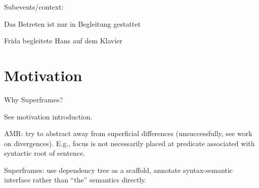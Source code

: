 \documentclass[a4paper]{article}
\begin{document}
Subevents/context:

Das Betreten ist nur in Begleitung gestattet

Frida begleitete Hans auf dem Klavier

\section{Motivation}

Why Superframes?

See motivation introduction.

AMR: try to abstract away from superficial differences (unsuccessfully, see work on divergences). E.g., focus is not necessarily placed at predicate associated with syntactic root of sentence.

Superframes: use dependency tree as a scaffold, annotate syntax-semantic interface rather than ``the'' semantics directly.

\clearpage



\end{document}
